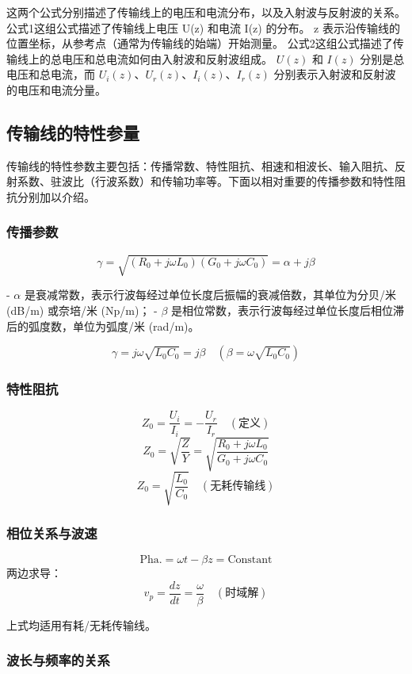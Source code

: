 这两个公式分别描述了传输线上的电压和电流分布，以及入射波与反射波的关系。公式1这组公式描述了传输线上电压 U(z) 和电流 I(z) 的分布。
z 表示沿传输线的位置坐标，从参考点（通常为传输线的始端）开始测量。
公式2这组公式描述了传输线上的总电压和总电流如何由入射波和反射波组成。
$U(z)$ 和 $I(z)$ 分别是总电压和总电流，而 $U_i(z)$、$U_r(z)$、$I_i(z)$、$I_r(z)$ 分别表示入射波和反射波的电压和电流分量。



\subsection{传输线的特性参量}
传输线的特性参数主要包括：传播常数、特性阻抗、相速和相波长、输入阻抗、反射系数、驻波比（行波系数）和传输功率等。下面以相对重要的传播参数和特性阻抗分别加以介绍。

\subsubsection{传播参数}

\[
\gamma = \sqrt{(R_0 + j \omega L_0)(G_0 + j \omega C_0)} = \alpha + j \beta
\]

- $\alpha$ 是衰减常数，表示行波每经过单位长度后振幅的衰减倍数，其单位为分贝/米 (dB/m) 或奈培/米 (Np/m)；
- $\beta$ 是相位常数，表示行波每经过单位长度后相位滞后的弧度数，单位为弧度/米 (rad/m)。

\[
\gamma = j \omega \sqrt{L_0 C_0} = j \beta \quad (\beta = \omega \sqrt{L_0 C_0})
\]

\subsubsection{特性阻抗}

\[
Z_0 = \frac{U_i}{I_i} = -\frac{U_r}{I_r} \quad (\text{定义})
\]
\[
Z_0 = \sqrt{\frac{Z}{Y}} = \sqrt{\frac{R_0 + j \omega L_0}{G_0 + j \omega C_0}}
\]
\[
Z_0 = \sqrt{\frac{L_0}{C_0}} \quad (\text{无耗传输线})
\]

\subsubsection{相位关系与波速}

\[
\text{Pha.} = \omega t - \beta z = \text{Constant}
\]
两边求导：
\[
v_p = \frac{dz}{dt} = \frac{\omega}{\beta} \quad (\text{时域解})
\]

上式均适用有耗/无耗传输线。

\subsubsection{波长与频率的关系}

